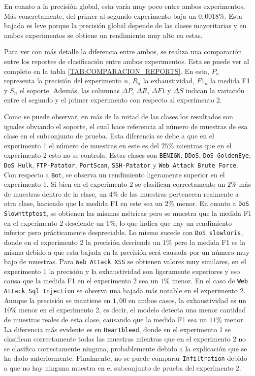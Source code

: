 En cuanto a la precisión global, esta varía muy poco entre ambos experimentos. Más concretamente, del primer al segundo experimento baja un $0,0018\%$. Esta bajada es leve porque la precisión global depende de las clases mayoritarias y en ambos experimentos se obtiene un rendimiento muy alto en estas.

Para ver con más detalle la diferencia entre ambos, se realiza una comparación entre los reportes de clasificación entre ambos experimentos. Esta se puede ver al completo en la tabla \ref{TAB:COMPARACION_REPORTS}. En esta, $P_n$ representa la precisión del experimento $n$, $R_n$ la exhaustividad, $F1_n$ la medida F1 y $S_n$ el soporte. Además, las columnas $\Delta P$, $\Delta R$, $\Delta F1$ y $\Delta S$ indican la variación entre el segundo y el primer experimento con respecto al experimento 2.

Como se puede observar, en más de la mitad de las clases los resultados son iguales obviando el soporte, el cual hace referencia al número de muestras de esa clase en el subconjunto de prueba. Esta diferencia se debe a que en el experimento 1 el número de muestras en este es del $25\%$ mientras que en el experimento 2 esto no se controla. Estas clases son \texttt{BENIGN}, \texttt{DDoS}, \texttt{DoS GoldenEye}, \texttt{DoS Hulk}, \texttt{FTP-Patator}, \texttt{PortScan}, \texttt{SSH-Patator} y \texttt{Web Attack Brute Force}. Con respecto a \texttt{Bot}, se observa un rendimiento ligeramente superior en el experimento 1. Si bien en el experimento 2 se clasifican correctamente un $2\%$ más de muestras dentro de la clase, un $4\%$ de las muestras pertenecen realmente a otra clase, haciendo que la medida F1 en este sea un $2\%$ menor. En cuanto a \texttt{DoS Slowhttptest}, se obtienen las mismas métricas pero se muestra que la medida F1 en el experimento 2 desciende un $1\%$, lo que indica que hay un rendimiento inferior pero prácticamente despreciable. Lo mismo sucede con \texttt{DoS slowloris}, donde en el experimento 2 la precisión desciende un $1\%$ pero la medida F1 es la misma debido a que esta bajada en la precisión será causada por un número muy bajo de muestras. Para \texttt{Web Attack XSS} se obtienen valores muy similares, en el experimento 1 la precisión y la exhaustividad son ligeramente superiores y eso causa que la medida F1 en el experimento 2 sea un $1\%$ menor. En el caso de \texttt{Web Attack Sql Injection} se observa una bajada más notable en el experimento 2. Aunque la precisión se mantiene en $1,00$ en ambos casos, la exhaustividad es un $10\%$ menor en el experimento 2, es decir, el modelo detecta una menor cantidad de muestras reales de esta clase, causando que la medida F1 sea un $11\%$ menor. La diferencia más evidente es en \texttt{Heartbleed}, donde en el experimento 1 se clasifican correctamente todas las muestras mientras que en el experimento 2 no se clasifica correctamente ninguna, probablemente debido a la explicación que se ha dado anteriormente. Finalmente, no se puede comparar \texttt{Infiltration} debido a que no hay ninguna muestra en el subconjunto de prueba del experimento 2.

